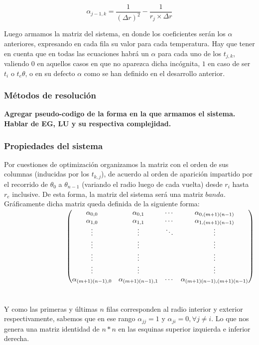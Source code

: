 \begin{equation}
\alpha_{j-1,k} = \frac{1}{(\Delta r)^2} - \frac{1}{r_j \times \Delta r}
\end{equation}

\vspace{5mm}

Luego armamos la matriz del sistema, en donde los coeficientes ser\'an los $\alpha$ anteriores, expresando en cada fila su valor para cada temperatura. Hay que tener en cuenta que en todas las ecuaciones habr\'a un $\alpha$ para cada uno de los $t_{j,k}$, valiendo $0$ en aquellos casos en que no aparezca dicha incógnita, $1$ en caso de ser $t_i$ o $t_e{\theta}$, o en su defecto $\alpha$ como se han definido en el desarrollo anterior.

\subsubsection{Métodos de resolución}

\textbf{Agregar pseudo-codigo de la forma en la que armamos el sistema. Hablar de EG, LU y su respectiva complejidad.}

\subsubsection{Propiedades del sistema}

Por cuestiones de optimizaci\'on organizamos la matriz con el orden de sus columnas (inducidas por los $t_{k,j}$), de acuerdo al orden de aparici\'on impartido por el recorrido de $\theta_0$ a $\theta_{n-1}$ (variando el radio luego de cada vuelta) desde $r_i$ hasta $r_e$ inclusive. De esta forma, la matriz del sistema ser\'a una matriz $banda$.
\\
Gráficamente dicha matriz queda definida de la siguiente forma:
\\

$
\hspace{3.2cm}
     \begin{pmatrix}
      \alpha_{0,0} & \alpha_{0,1} & \cdots & \alpha_{0,(m+1)(n-1)} \\
      \alpha_{1,0} & \alpha_{1,1} & \cdots & \alpha_{1,(m+1)(n-1)} \\
      \vdots  & \vdots  & \ddots & \vdots \\
      \vdots  & \vdots  &        & \vdots \\
      \vdots  & \vdots  &        & \vdots \\
      \vdots  & \vdots  &        & \vdots \\
      \alpha_{(m+1)(n-1),0} & \alpha_{(m+1)(n-1),1} & \cdots & \alpha_{(m+1)(n-1),(m+1)(n-1)} 
     \end{pmatrix}
$
\\
\\
\\
Y como las primeras y \'ultimas $n$ filas corresponden al radio interior y exterior respectivamente, sabemos que en ese rango $\alpha_{jj} = 1$ y $\alpha_{ji} = 0, \forall j \neq i$. Lo que nos genera una matriz identidad de $n*n$ en las esquinas superior izquierda e inferior derecha.

